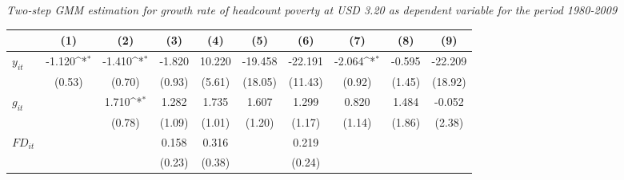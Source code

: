 \documentclass[12pt, a4paper]{article}
\begin{document}
\begin{table}
\begin{threeparttable}
\begin{tablenotes}
		\end{tablenotes}
	\end{threeparttable}
	\caption[Two-Step System-GMM Estimation Results for Headcount Poverty at USD 3.20 for 1980-2009]{\textit{Two-step GMM estimation for growth rate of headcount poverty at USD 3.20 as dependent variable for the period 1980-2009}}
	\label{2GMM3202010}
\end{table}

	\begin{table}
	\centering
	\scriptsize
	\setlength\tabcolsep{1pt}	
	\begin{threeparttable}
		{
			\def\sym#1{\ifmmode^{#1}\else\(^{#1}\)\fi}
			\begin{tabular}{l*{9}{c}}
				\hline\hline
				&\multicolumn{1}{c}{(1)}&\multicolumn{1}{c}{(2)}&\multicolumn{1}{c}{(3)}&\multicolumn{1}{c}{(4)}&\multicolumn{1}{c}{(5)}&\multicolumn{1}{c}{(6)}&\multicolumn{1}{c}{(7)}&\multicolumn{1}{c}{(8)}&\multicolumn{1}{c}{(9)}\\
				\hline
				$y_{it}$               &      -1.120\sym{*}  &      -1.410\sym{*}  &      -1.820         &      10.220         &     -19.458         &     -22.191         &      -2.064\sym{*}  &      -0.595         &     -22.209         \\
				&      (0.53)         &      (0.70)         &      (0.93)         &      (5.61)         &     (18.05)         &     (11.43)         &      (0.92)         &      (1.45)         &     (18.92)         \\
				$g_{it}$             &                     &       1.710\sym{*}  &       1.282         &       1.735         &       1.607         &       1.299         &       0.820         &       1.484         &      -0.052         \\
				&                     &      (0.78)         &      (1.09)         &      (1.01)         &      (1.20)         &      (1.17)         &      (1.14)         &      (1.86)         &      (2.38)         \\
				$FD_{it}$                &                     &                     &       0.158         &       0.316         &                     &       0.219         &                     &                     &                     \\
				&                     &                     &      (0.23)         &      (0.38)         &                     &      (0.24)         &                     &                     &                     \\

\end{tabular}}
\end{threeparttable}
\end{table}
\end{document}
